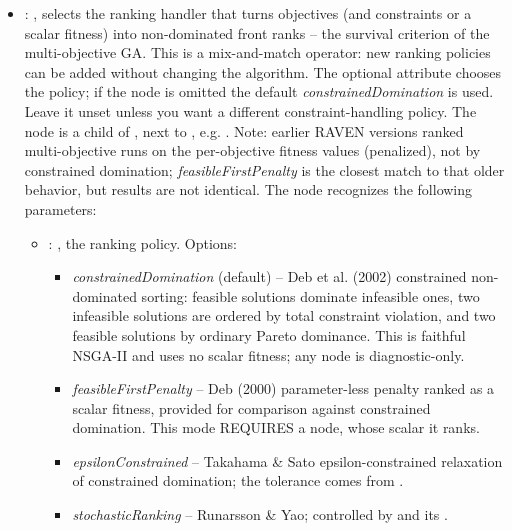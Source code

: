 \begin{itemize}
    \item {}: ,
      selects the ranking handler that turns objectives (and constraints or a scalar
      fitness) into non-dominated front ranks -- the survival criterion of the
      multi-objective GA. This is a mix-and-match operator: new ranking policies can be
      added without changing the algorithm. The optional  attribute chooses
      the policy; if the node is omitted the default \textit{constrainedDomination} is
      used. Leave it unset unless you want a different constraint-handling policy.
      The node is a child of , next to
      , e.g. .
      Note: earlier RAVEN versions ranked multi-objective runs on the per-objective
      fitness values (penalized), not by constrained domination; \textit{feasibleFirstPenalty}
      is the closest match to that older behavior, but results are not identical.
      The  node recognizes the following parameters:
        \begin{itemize}
          \item {}: ,
            the ranking policy. Options:                   \begin{itemize}                     \item
            \textit{constrainedDomination} (default) -- Deb et al. (2002) constrained
            non-dominated sorting: feasible solutions dominate infeasible ones, two
            infeasible solutions are ordered by total constraint violation, and two
            feasible solutions by ordinary Pareto dominance. This is faithful NSGA-II and
            uses no scalar fitness; any  node is diagnostic-only.
            \item \textit{feasibleFirstPenalty} -- Deb (2000) parameter-less penalty ranked as a
            scalar fitness, provided for comparison against constrained domination. This
            mode REQUIRES a  node, whose scalar it ranks.                     \item
            \textit{epsilonConstrained} -- Takahama \& Sato epsilon-constrained relaxation
            of constrained domination; the tolerance comes from .
            \item \textit{stochasticRanking} -- Runarsson \& Yao; controlled by
             and its .                   \end{itemize}
      \end{itemize}


\end{itemize}
